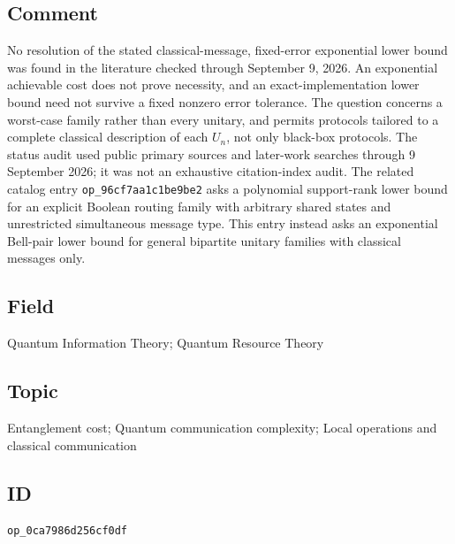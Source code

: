\subsection*{Comment}

No resolution of the stated classical-message, fixed-error exponential lower bound was found in the literature checked through September 9, 2026. An exponential achievable cost does not prove necessity, and an exact-implementation lower bound need not survive a fixed nonzero error tolerance. The question concerns a worst-case family rather than every unitary, and permits protocols tailored to a complete classical description of each $U_n$, not only black-box protocols. The status audit used public primary sources and later-work searches through 9 September 2026; it was not an exhaustive citation-index audit. The related catalog entry \texttt{op\_96cf7aa1c1be9be2} asks a polynomial support-rank lower bound for an explicit Boolean routing family with arbitrary shared states and unrestricted simultaneous message type. This entry instead asks an exponential Bell-pair lower bound for general bipartite unitary families with classical messages only.

\subsection*{Field}

Quantum Information Theory; Quantum Resource Theory

\subsection*{Topic}

Entanglement cost; Quantum communication complexity; Local operations and classical communication

\subsection*{ID}

\texttt{op\_0ca7986d256cf0df}

